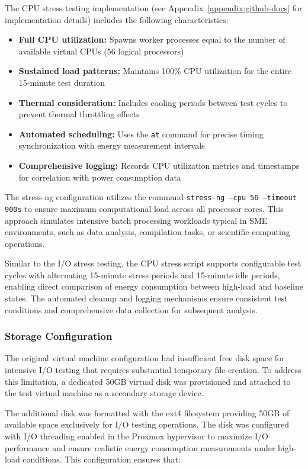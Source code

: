 The CPU stress testing implementation (see Appendix~\ref{appendix:github-docs} 
for implementation details) includes the following characteristics:
\begin{itemize}
    \item \textbf{Full CPU utilization:} Spawns worker processes equal to the 
    number of available virtual CPUs (56 logical processors)
    \item \textbf{Sustained load patterns:} Maintains 100\% CPU utilization 
    for the entire 15-minute test duration
    \item \textbf{Thermal consideration:} Includes cooling periods between test 
    cycles to prevent thermal throttling effects
    \item \textbf{Automated scheduling:} Uses the \texttt{at} command for 
    precise timing synchronization with energy measurement intervals
    \item \textbf{Comprehensive logging:} Records CPU utilization metrics and 
    timestamps for correlation with power consumption data
\end{itemize}

The stress-ng configuration utilizes the command 
\texttt{stress-ng --cpu 56 --timeout 900s} to ensure maximum computational 
load across all processor cores. This approach simulates intensive batch 
processing workloads typical in SME environments, such as data analysis, 
compilation tasks, or scientific computing operations.

Similar to the I/O stress testing, the CPU stress script supports configurable 
test cycles with alternating 15-minute stress periods and 15-minute idle 
periods, enabling direct comparison of energy consumption between high-load 
and baseline states. The automated cleanup and logging mechanisms ensure 
consistent test conditions and comprehensive data collection for subsequent 
analysis.

\subsubsection{Storage Configuration}
\label{methodology:storage-configuration}
The original virtual machine configuration had insufficient free disk space for intensive
I/O testing that requires substantial temporary file creation. To address this limitation, a
dedicated 50GB virtual disk was provisioned and attached to the test virtual machine as a
secondary storage device.

The additional disk was formatted with the ext4 filesystem providing 50GB of available space
exclusively for I/O testing operations. The disk was configured with I/O threading enabled in 
the Proxmox hypervisor to maximize I/O performance and ensure realistic energy consumption
measurements under high-load conditions.
This configuration ensures that:

